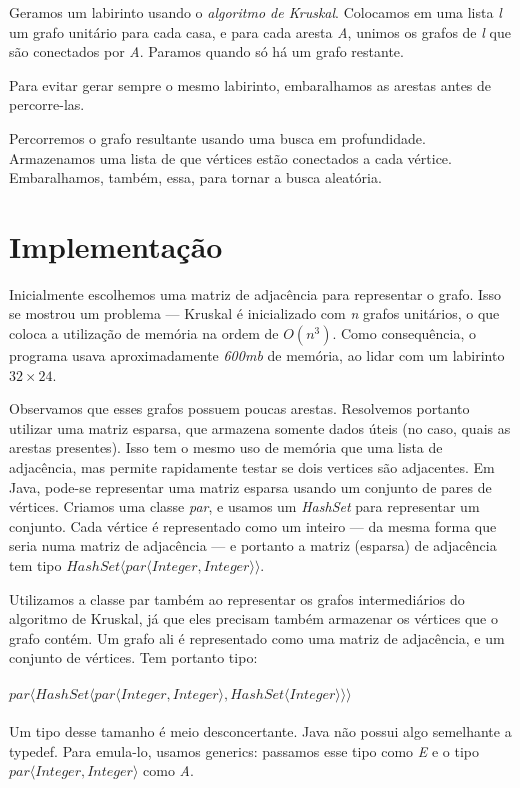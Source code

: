 \documentclass{article}
\begin{document}
Geramos um labirinto usando o \emph{algoritmo de Kruskal}. Colocamos em
uma lista \emph{l} um grafo unitário para cada casa, e para cada aresta
\emph{A}, unimos os grafos de \emph{l} que são conectados por
\emph{A}. Paramos quando só há um grafo restante.

Para evitar gerar sempre o mesmo labirinto, embaralhamos as arestas
antes de percorre-las.

Percorremos o grafo resultante usando uma busca em
profundidade. Armazenamos uma lista de que vértices estão conectados a
cada vértice. Embaralhamos, também, essa, para tornar a busca aleatória.

\section*{Implementação}

Inicialmente escolhemos uma matriz de adjacência para representar o
grafo. Isso se mostrou um problema --- Kruskal é inicializado com
\emph{n} grafos unitários, o que coloca a utilização de memória na ordem
de \emph{$O(n^3)$}. Como consequência, o programa usava aproximadamente
\emph{600mb} de memória, ao lidar com um labirinto \emph{$32 \times
  24$}.

Observamos que esses grafos possuem poucas arestas. Resolvemos portanto
utilizar uma matriz esparsa, que armazena somente dados úteis (no caso,
quais as arestas presentes). Isso tem o mesmo uso de memória que uma
lista de adjacência, mas permite rapidamente testar se dois vertices são
adjacentes. Em Java, pode-se representar uma matriz esparsa usando um
conjunto de pares de vértices. Criamos uma classe \emph{par}, e usamos
um \emph{HashSet} para representar um conjunto. Cada vértice é
representado como um inteiro --- da mesma forma que seria numa matriz de
adjacência --- e portanto a matriz (esparsa) de adjacência tem tipo
\emph{$HashSet \langle par \langle Integer, Integer \rangle \rangle$}.

Utilizamos a classe par também ao representar os grafos intermediários
do algoritmo de Kruskal, já que eles precisam também armazenar os
vértices que o grafo contém. Um grafo ali é representado como uma matriz
de adjacência, e um conjunto de vértices. Tem portanto tipo:\\
\\
\emph{$par \langle HashSet \langle par \langle Integer, Integer \rangle
  , HashSet \langle Integer \rangle \rangle \rangle$}
\\
\\Um tipo desse tamanho é meio desconcertante. Java não possui algo
semelhante a typedef. Para emula-lo, usamos generics: passamos esse tipo
como \emph{E} e o tipo \emph{$par \langle Integer, Integer \rangle$}
como \emph{A}.
\end{document}
